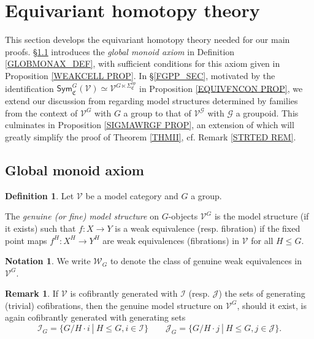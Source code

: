 \documentclass[a4paper,10pt
,draft
]{article}%
\numberwithin{equation}{section}
\numberwithin{figure}{section}
\theoremstyle{definition} %
\newtheorem{definition}[equation]{Definition}%
\newtheorem{remark}[equation]{Remark}%
\newtheorem{notation}[equation]{Notation}%
\newcommand{\V}{\ensuremath{\mathcal V}}
\newcommand{\G}{\ensuremath{\mathcal G}}
\newcommand{\1}{\ensuremath{\mathbbm 1}}%
\begin{document}
\section{Equivariant homotopy theory}
\label{EHT_SEC}

This section develops the 
equivariant homotopy theory 
needed for our main proofs.
\S \ref{GMA_SEC} introduces the \emph{global monoid axiom}
in Definition \ref{GLOBMONAX_DEF}, 
with sufficient conditions for this axiom given in 
Proposition \ref{WEAKCELL PROP}.
In \S \ref{FGPP_SEC},
motivated by the identification
$\mathsf{Sym}^{G}_{\mathfrak{C}}(\V)
\simeq \V^{G \ltimes \Sigma^{op}_{\mathfrak{C}}}$
in Proposition \ref{EQUIVFNCON PROP}, 
we extend our discussion 
from \cite[\S 6]{BP_geo}
regarding model structures determined by families
from the context of $\V^G$ with $G$ a group to that of
$\V^{\G}$ with $\G$ a groupoid.
This culminates in Proposition \ref{SIGMAWRGF PROP}, an extension of \cite[Prop. 6.25]{BP_geo}
which will greatly simplify the proof of Theorem \ref{THMII},
cf. Remark \ref{STRTED REM}.


\subsection{Global monoid axiom}
\label{GMA_SEC}



\begin{definition}\label{GENMOD DEF}
	Let $\V$ be a model category and $G$ a group.
	
	The \emph{genuine (or fine) model structure} on $G$-objects $\V^G$
	is the model structure (if it exists)
	such that
	$f\colon X \to Y$
	is a weak equivalence (resp. fibration)
	if the fixed point maps
	$f^H\colon X^H \to Y^H$
	are weak equivalences (fibrations) in $\V$
	for all $H \leq G$.
\end{definition}


\begin{notation}
	We write $\mathcal{W}_G$
	to denote the class of genuine weak equivalences in $\V^G$.
\end{notation}


\begin{remark}
	If $\V$ is cofibrantly generated with 
	$\mathcal{I}$ (resp. $\mathcal{J}$)
	the sets of generating (trivial) cofibrations,
	then the genuine model structure on $\V^G$,
	should it exist,
	is again cofibrantly generated with generating sets
	\begin{equation}\label{GENGENSETEQ}
	\mathcal{I}_G = \{G/H \cdot i \ | \ H\leq G,i\in \mathcal{I}\}
	\qquad
	\mathcal{J}_G = \{G/H \cdot j \ | \ H\leq G,j\in \mathcal{J}\}.
	\end{equation}
\end{remark}
\end{document}
